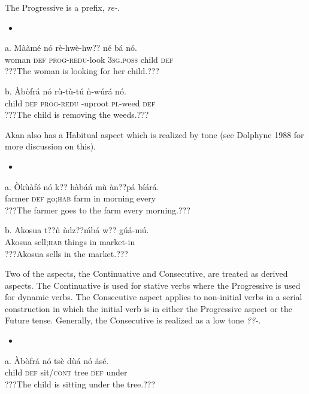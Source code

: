 \documentclass[output=paper]{langsci/langscibook}
\begin{document}
The Progressive is a prefix, \emph{re-}.

\begin{itemize}
\item \end{itemize}
\gll \textup{a.  }M\`{a}\`{a}m\'{e}   n\'{o}  r\`{e}-hw\`{e}-hw??     n\'{e}    b\'{a}   n\'{o}.\\
       woman    \textsc{def}  \textsc{prog-redu}{}-look  \textsc{3sg.poss}  child  \textsc{def}\\
\glt ???The woman is looking for her child.???
\z

\gll b.  \`{A}b\`{o}fr\'{a}  n\'{o}  r\`{u}-t\`{u}-t\'{u}    \`{n}-w\'{u}r\'{a}    n\'{o}.\\
       child  \textsc{def}  \textsc{prog-redu} -uproot  \textsc{pl}{}-weed  \textsc{def}\\
\glt ???The child is removing the weeds.???
\z

Akan also has a Habitual aspect which is realized by tone (see Dolphyne 1988 for more discussion on this).

\begin{itemize}
\item \end{itemize}
\gll a.  \`{O}k\`{u}\`{a}f\'{o}  n\'{o}   k??    h\`{a}b\'{a}\'{n}  m\`{u}  \`{a}n??p\'{a}    b\'{i}\'{a}r\'{a}.\\
       farmer  \textsc{def}  go;\textsc{hab}    farm  in  morning  every\\
\glt ???The farmer goes to the farm every morning.???
\z

\gll b.  Akosua    t??\`{n}     \`{n}dz??\'{m}b\'{a}  w??  g\'{u}\'{a}-m\'{u}.\\
       Akosua  sell;\textsc{hab}  things    in  market-in\\
\glt ???Akosua sells in the market.???
\z

Two of the aspects, the Continuative and Consecutive, are treated as derived aspects. The Continuative is used for stative verbs where the Progressive is used for dynamic verbs. The Consecutive aspect applies to non-initial verbs in a serial construction in which the initial verb is in either the Progressive aspect or the Future tense. Generally, the Consecutive is realized as a low tone \emph{??-}.

\begin{itemize}
\item \end{itemize}
\gll a.  \`{A}b\`{o}fr\'{a}  n\'{o}  ts\`{e}    d\`{u}\'{a}  n\'{o}  \'{a}s\'{e}.\\
       child  \textsc{def}  sit/\textsc{cont}  tree  \textsc{def}  under\\
\glt ???The child is sitting under the tree.???
\z
\end{document}
